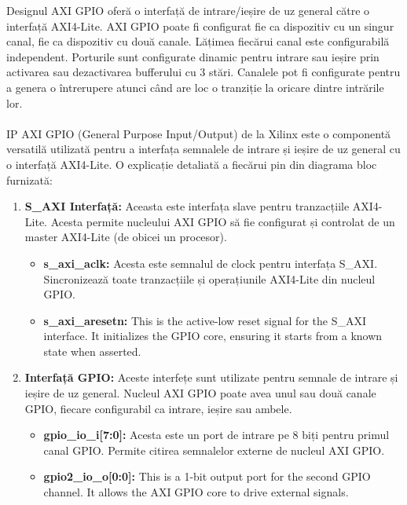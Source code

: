\documentclass[12pt]{article}
\begin{document}
\hspace*{1cm}Designul AXI GPIO oferă o interfață de intrare/ieșire de uz general către o interfață AXI4-Lite. AXI GPIO poate fi configurat fie ca dispozitiv cu un singur canal, fie ca dispozitiv cu două canale. Lățimea fiecărui canal este configurabilă independent. Porturile sunt configurate dinamic pentru intrare sau ieșire prin activarea sau dezactivarea bufferului cu 3 stări. Canalele pot fi configurate pentru a genera o întrerupere atunci când are loc o tranziție la oricare dintre intrările lor.\\\\
\hspace*{1cm}IP AXI GPIO (General Purpose Input/Output) de la Xilinx este o componentă versatilă utilizată pentru a interfața semnalele de intrare și ieșire de uz general cu o interfață AXI4-Lite. O explicație detaliată a fiecărui pin din diagrama bloc furnizată:
\begin{enumerate}
    \item \textbf{S\_AXI Interfață:} Aceasta este interfața slave pentru tranzacțiile AXI4-Lite. Acesta permite nucleului AXI GPIO să fie configurat și controlat de un master AXI4-Lite (de obicei un procesor).
    \begin{itemize}
        \item \textbf{s\_axi\_aclk:} Acesta este semnalul de clock pentru interfața S\_AXI. Sincronizează toate tranzacțiile și operațiunile AXI4-Lite din nucleul GPIO.
        \item \textbf{s\_axi\_aresetn:} This is the active-low reset signal for the S\_AXI interface. It initializes the GPIO core, ensuring it starts from a known state when asserted.
    \end{itemize}
    \item \textbf{Interfață GPIO:} Aceste interfețe sunt utilizate pentru semnale de intrare și ieșire de uz general. Nucleul AXI GPIO poate avea unul sau două canale GPIO, fiecare configurabil ca intrare, ieșire sau ambele.
    \begin{itemize}
        \item \textbf{gpio\_io\_i[7:0]:} Acesta este un port de intrare pe 8 biți pentru primul canal GPIO. Permite citirea semnalelor externe de nucleul AXI GPIO.
        \item \textbf{gpio2\_io\_o[0:0]:} This is a 1-bit output port for the second GPIO channel. It allows the AXI GPIO core to drive external signals.
    \end{itemize}
\end{enumerate}
\end{document}
